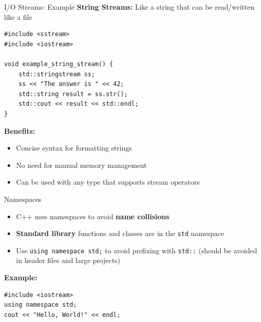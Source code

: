\begin{frame}[fragile]{I/O Streams: Example}
    \textbf{String Streams:} Like a string that can be read/written like a file
    \begin{verbatim}
#include <sstream>
#include <iostream>

void example_string_stream() {
    std::stringstream ss;
    ss << "The answer is " << 42;
    std::string result = ss.str();
    std::cout << result << std::endl;
}
    \end{verbatim}

    \textbf{Benefits:}
    \begin{itemize}
        \item Concise syntax for formatting strings
        \item No need for manual memory management
        \item Can be used with any type that supports stream operators
    \end{itemize}
\end{frame}

\begin{frame}[fragile]{Namespaces}
	\begin{itemize}
		\item C++ uses namespaces to avoid \textbf{name collisions}
		\item \textbf{Standard library} functions and classes are in the \texttt{std} namespace
		\item Use \texttt{using namespace std;} to avoid prefixing with \texttt{std::} (should be avoided in header files and large projects)
	\end{itemize}
	\textbf{Example:}
	\begin{verbatim}
#include <iostream>
using namespace std;
cout << "Hello, World!" << endl;
        \end{verbatim}
\end{frame}

